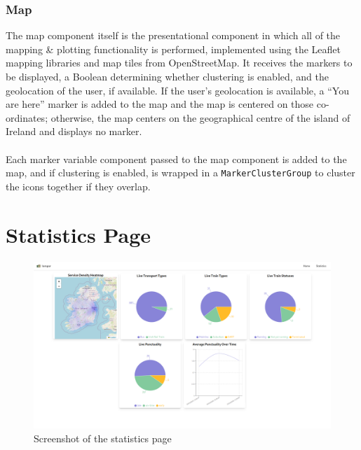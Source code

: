 \documentclass[a4paper,11pt]{report}
\begin{document}
\subsubsection{Map}
The map component itself is the presentational component in which all of the mapping \& plotting functionality is performed, implemented using the Leaflet\supercite{leaflet} mapping libraries and map tiles from OpenStreetMap\supercite{osm}.
It receives the markers to be displayed, a Boolean determining whether clustering is enabled, and the geolocation of the user, if available.
If the user's geolocation is available, a ``You are here'' marker is added to the map and the map is centered on those co-ordinates;
otherwise, the map centers on the geographical centre of the island of Ireland\supercite{osi} and displays no marker.
\\\\
Each marker variable component passed to the map component is added to the map, and if clustering is enabled, is wrapped in a \texttt{MarkerClusterGroup} to cluster the icons together if they overlap.

\section{Statistics Page}
\begin{figure}[H]
    \centering
    \includegraphics[width=\textwidth]{./images/statisiticspage.png}
    \caption{Screenshot of the statistics page}
\end{figure}
\end{document}
